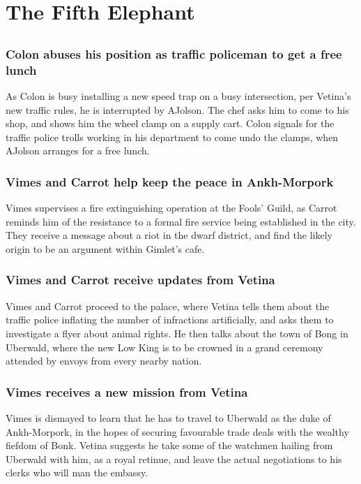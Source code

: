 \section{The Fifth Elephant}


\subsection{}
\subsubsection{\Gls{Colon} abuses his position as traffic policeman to get a free lunch}
As \Gls{Colon} is busy installing a new speed trap on a busy intersection, per \Gls{Vetina}'s new
traffic rules, he is interrupted by \Gls{AJolson}. The chef asks him to come to his shop, and shows
him the wheel clamp on a supply cart. \Gls{Colon} signals for the traffic police trolls working in
his department to come undo the clamps, when \Gls{AJolson} arranges for a free lunch.

\subsubsection{\Gls{Vimes} and \Gls{Carrot} help keep the peace in Ankh-Morpork}
\Gls{Vimes} supervises a fire extinguishing operation at the Fools' Guild, as \Gls{Carrot} reminds
him of the resistance to a formal fire service being established in the city. They receive a message
about a riot in the dwarf district, and find the likely origin to be an argument within
\Gls{Gimlet}'s cafe.

\subsubsection{\Gls{Vimes} and \Gls{Carrot} receive updates from \Gls{Vetina}}
\Gls{Vimes} and \Gls{Carrot} proceed to the palace, where \Gls{Vetina} tells them about the traffic
police inflating the number of infractions artificially, and asks them to investigate a flyer
about animal rights. He then talks about the town of Bong in Uberwald, where the new Low King is to
be crowned in a grand ceremony attended by envoys from every nearby nation.

\subsubsection{\Gls{Vimes} receives a new mission from \Gls{Vetina}}
\Gls{Vimes} is dismayed to learn that he has to travel to Uberwald as the duke of Ankh-Morpork, in
the hopes of securing favourable trade deals with the wealthy fiefdom of Bonk. \Gls{Vetina} suggests
he take some of the watchmen hailing from Uberwald with him, as a royal retinue, and leave the
actual negotiations to his clerks who will man the embassy.

